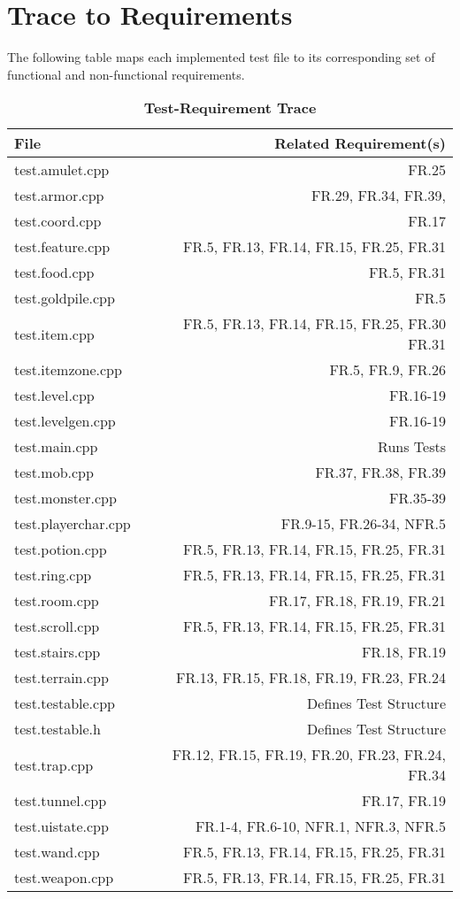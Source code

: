 \documentclass[12pt, titlepage]{article}
\newcommand{\newsection}[1]{\newpage\section{#1}}
\begin{document}
\newsection{Trace to Requirements} \label{Section_R_Trace}

	The following table maps each implemented test file to its corresponding set of functional and non-functional requirements. 

	\begin{table}[H] \label{TblMH}
		\caption{\bf Test-Requirement Trace}
		\centering
		\bigskip
		\def\arraystretch{1.04}
		\begin{tabular}{l r}
			\toprule
			\bf File & \bf Related Requirement(s)\\
			\midrule
			test.amulet.cpp 		& FR.25\\
			test.armor.cpp 			& FR.29, FR.34, FR.39,\\
			test.coord.cpp 			& FR.17\\
			test.feature.cpp 		& FR.5, FR.13, FR.14, FR.15, FR.25, FR.31\\
			test.food.cpp 			& FR.5, FR.31\\
			test.goldpile.cpp 		& FR.5\\
			test.item.cpp 			& FR.5, FR.13, FR.14, FR.15, FR.25, FR.30 FR.31\\
			test.itemzone.cpp 		& FR.5, FR.9, FR.26\\
			test.level.cpp 			& FR.16-19\\
			test.levelgen.cpp 		& FR.16-19\\
			test.main.cpp 			& Runs Tests\\
			test.mob.cpp 			& FR.37, FR.38, FR.39\\
			test.monster.cpp 		& FR.35-39\\
			test.playerchar.cpp 	& FR.9-15, FR.26-34, NFR.5\\
			test.potion.cpp 		& FR.5, FR.13, FR.14, FR.15, FR.25, FR.31\\
			test.ring.cpp 			& FR.5, FR.13, FR.14, FR.15, FR.25, FR.31\\
			test.room.cpp 			& FR.17, FR.18, FR.19, FR.21\\
			test.scroll.cpp 		& FR.5, FR.13, FR.14, FR.15, FR.25, FR.31\\
			test.stairs.cpp 		& FR.18, FR.19\\
			test.terrain.cpp 		& FR.13, FR.15, FR.18, FR.19, FR.23, FR.24\\
			test.testable.cpp 		& Defines Test Structure\\
			test.testable.h 		& Defines Test Structure\\
			test.trap.cpp 			& FR.12, FR.15, FR.19, FR.20, FR.23, FR.24, FR.34\\
			test.tunnel.cpp 		& FR.17, FR.19\\
			test.uistate.cpp 		& FR.1-4, FR.6-10, NFR.1, NFR.3, NFR.5\\
			test.wand.cpp 			& FR.5, FR.13, FR.14, FR.15, FR.25, FR.31\\
			test.weapon.cpp 		& FR.5, FR.13, FR.14, FR.15, FR.25, FR.31\\
			\hline
		\end{tabular}
	\end{table}
\end{document}
